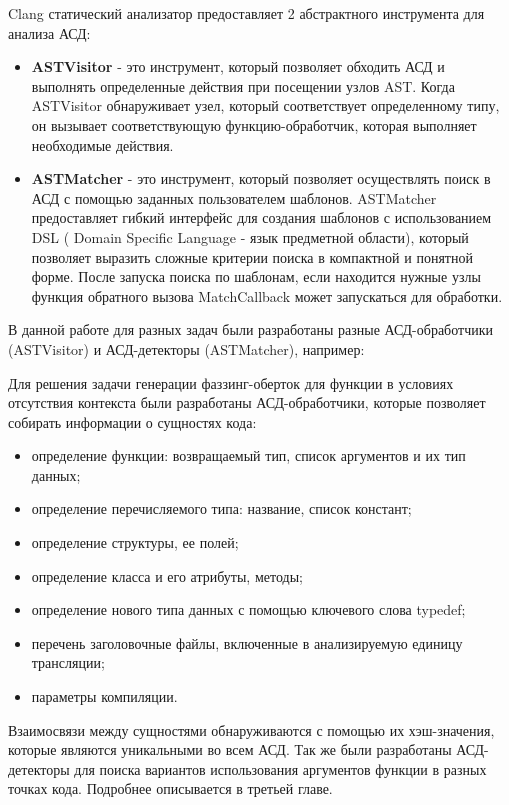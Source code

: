 Clang статический анализатор предоставляет 2 абстрактного инструмента для анализа АСД:
\begin{itemize}
    \item {\textbf{ASTVisitor}} - это инструмент, который позволяет обходить АСД и выполнять определенные действия при посещении узлов AST. Когда ASTVisitor обнаруживает узел, который соответствует определенному типу, он вызывает соответствующую функцию-обработчик, которая выполняет необходимые действия.
    \item {\textbf{ASTMatcher}} - это инструмент, который позволяет осуществлять поиск в АСД с помощью заданных пользователем шаблонов. ASTMatcher предоставляет гибкий интерфейс для создания шаблонов с использованием DSL ( Domain Specific Language - язык предметной области), который позволяет выразить сложные критерии поиска в компактной и понятной форме. После запуска поиска по шаблонам, если находится нужные узлы функция обратного вызова MatchCallback может запускаться для обработки.
\end{itemize}

В данной работе для разных задач были разработаны разные АСД-обработчики (ASTVisitor) и АСД-детекторы (ASTMatcher), например:

Для решения задачи генерации фаззинг-оберток для функции в условиях отсутствия контекста были разработаны АСД-обработчики, которые позволяет собирать информации о сущностях кода:
\begin{itemize}
    \item определение функции: возвращаемый тип, список аргументов и их тип данных;
    \item определение перечисляемого типа: название, список констант;
    \item определение структуры, ее полей;
    \item определение класса и его атрибуты, методы;
    \item определение нового типа данных с помощью ключевого слова typedef;
    \item перечень заголовочные файлы, включенные в анализируемую единицу трансляции;
    \item параметры компиляции.
\end{itemize}
Взаимосвязи  между сущностями обнаруживаются с помощью их хэш-значения, которые являются уникальными во всем АСД.
Так же были разработаны АСД-детекторы для поиска вариантов использования аргументов функции в разных точках кода. Подробнее описывается в третьей главе.


